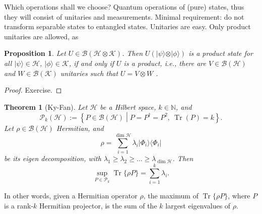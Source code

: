 \documentclass{article}
\newtheorem{proposition}{Proposition}
\newtheorem{theorem}{Theorem}
\theoremstyle{definition}
\newcommand{\tr}{\operatorname{Tr}}
\newcommand{\ket}[1]{\vert #1 \rangle}
\newcommand{\bra}[1]{\langle #1 \vert}
\newcommand{\bounded}[1]{\mathcal{B}(#1)}
\begin{document}
Which operations shall we choose? Quantum operations of (pure) states, thus they will consist of unitaries and measurements. Minimal requirement: do not transform separable states to entangled states. Unitaries are easy. Only product unitaries are allowed, as
\begin{proposition}
  Let $U\in \bounded{\mathcal{H}\otimes\mathcal{K}}$. Then $U (\ket{\psi} \otimes \ket{\phi})$ is a product state for all $\ket{\psi}\in\mathcal{H}$, $\ket{\phi}\in\mathcal{K}$, if and only if $U$ is a product, i.e., there are $V\in\bounded{\mathcal{H}}$ and $ W\in \bounded{\mathcal{K}}$ unitaries such that $U = V\otimes W$ .
\end{proposition}
\begin{proof} Exercise.
\end{proof}

\begin{theorem}[Ky-Fan]\label{thm:Ky-Fan}
  Let $\mathcal{H}$ be a Hilbert space, $k\in\mathbb{N}$, and 
  \begin{equation*}
    \mathcal{P}_k(\mathcal{H}):= \left\{ P\in\bounded{\mathcal{H}} \middle|  P = P^\dagger = P^2,\ \tr(P)=k\right\}.
  \end{equation*}
  Let $\rho\in \bounded{\mathcal{H}}$ Hermitian, and 
  \begin{equation*}
    \rho = \sum_{i=1}^{\dim\mathcal{H}} \lambda_i \ket{\Phi_i}\bra{\Phi_i}
  \end{equation*}
  be its eigen decomposition, with $\lambda_1 \geq \lambda_2 \geq \dots \geq \lambda_{\dim \mathcal{H}}$. Then 
  \begin{equation*}
    \sup_{P\in\mathcal{P}_k} \tr\{\rho P\} = \sum_{i=1}^k \lambda_i.
  \end{equation*}
\end{theorem}

In other words, given a Hermitian operator $\rho$, the maximum of $\tr\{\rho P\}$, where $P$ is a rank-$k$ Hermitian projector, is the sum of the $k$ largest eigenvalues of $\rho$.
\end{document}
